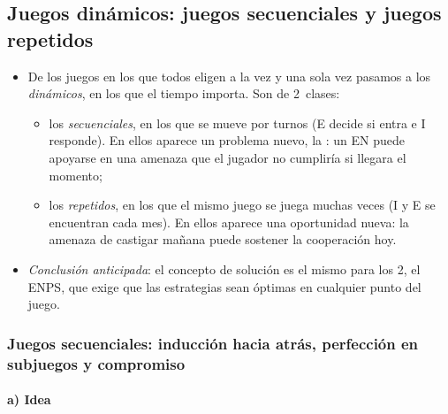 \documentclass[11pt]{article}
\begin{document}
\subsection{Juegos dinámicos: juegos secuenciales y juegos repetidos}\label{sec:juegos-dinamicos}

\begin{itemize}
\item De los juegos en los que todos eligen a la vez y una sola vez pasamos a los \emph{dinámicos}, en los que el tiempo importa. Son de 2~clases:
  \begin{itemize}
  \item los \emph{secuenciales}, en los que se mueve por turnos (E decide si entra e I responde). En ellos aparece un problema nuevo, la : un EN puede apoyarse en una amenaza que el jugador no cumpliría si llegara el momento;
  \item los \emph{repetidos}, en los que el mismo juego se juega muchas veces (\textup{I} y E se encuentran cada mes). En ellos aparece una oportunidad nueva: la amenaza de castigar mañana puede sostener la cooperación hoy.
  \end{itemize}
\item \emph{Conclusión anticipada}: el concepto de solución es el mismo para los 2, el ENPS, que exige que las estrategias sean óptimas en cualquier punto del juego.
\end{itemize}

\subsubsection{Juegos secuenciales: inducción hacia atrás, perfección en subjuegos y compromiso}\label{sec:enps}

\paragraph{a) Idea}
\end{document}
